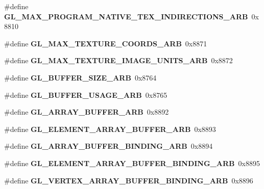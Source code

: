 \begin{DoxyCompactItemize}
\item 
\#define {\bfseries G\+L\+\_\+\+M\+A\+X\+\_\+\+P\+R\+O\+G\+R\+A\+M\+\_\+\+N\+A\+T\+I\+V\+E\+\_\+\+T\+E\+X\+\_\+\+I\+N\+D\+I\+R\+E\+C\+T\+I\+O\+N\+S\+\_\+\+A\+R\+B}~0x8810\label{_s_d_l__opengl_8h_a2be0f0ad505c7415604be985b6add29c}

\item 
\#define {\bfseries G\+L\+\_\+\+M\+A\+X\+\_\+\+T\+E\+X\+T\+U\+R\+E\+\_\+\+C\+O\+O\+R\+D\+S\+\_\+\+A\+R\+B}~0x8871\label{_s_d_l__opengl_8h_a8a43e31ad6ecfc7e840dd80cc44438b7}

\item 
\#define {\bfseries G\+L\+\_\+\+M\+A\+X\+\_\+\+T\+E\+X\+T\+U\+R\+E\+\_\+\+I\+M\+A\+G\+E\+\_\+\+U\+N\+I\+T\+S\+\_\+\+A\+R\+B}~0x8872\label{_s_d_l__opengl_8h_a4b1b083176bc9e9fc132692f589d3436}

\item 
\#define {\bfseries G\+L\+\_\+\+B\+U\+F\+F\+E\+R\+\_\+\+S\+I\+Z\+E\+\_\+\+A\+R\+B}~0x8764\label{_s_d_l__opengl_8h_a79b32a071af137fa59ca406e3e8254e7}

\item 
\#define {\bfseries G\+L\+\_\+\+B\+U\+F\+F\+E\+R\+\_\+\+U\+S\+A\+G\+E\+\_\+\+A\+R\+B}~0x8765\label{_s_d_l__opengl_8h_af76ad34f6b2ded96a99fa8fce2731a43}

\item 
\#define {\bfseries G\+L\+\_\+\+A\+R\+R\+A\+Y\+\_\+\+B\+U\+F\+F\+E\+R\+\_\+\+A\+R\+B}~0x8892\label{_s_d_l__opengl_8h_acb1c5ea3239de87d09959457ffa42f6f}

\item 
\#define {\bfseries G\+L\+\_\+\+E\+L\+E\+M\+E\+N\+T\+\_\+\+A\+R\+R\+A\+Y\+\_\+\+B\+U\+F\+F\+E\+R\+\_\+\+A\+R\+B}~0x8893\label{_s_d_l__opengl_8h_ae01505dfe71e32eddbd73c3c0ce713ba}

\item 
\#define {\bfseries G\+L\+\_\+\+A\+R\+R\+A\+Y\+\_\+\+B\+U\+F\+F\+E\+R\+\_\+\+B\+I\+N\+D\+I\+N\+G\+\_\+\+A\+R\+B}~0x8894\label{_s_d_l__opengl_8h_aa31e7d2730e196f2f41933e1b70ae121}

\item 
\#define {\bfseries G\+L\+\_\+\+E\+L\+E\+M\+E\+N\+T\+\_\+\+A\+R\+R\+A\+Y\+\_\+\+B\+U\+F\+F\+E\+R\+\_\+\+B\+I\+N\+D\+I\+N\+G\+\_\+\+A\+R\+B}~0x8895\label{_s_d_l__opengl_8h_a37d58cc04db7ee70ec314e007b4d9f5a}

\item 
\#define {\bfseries G\+L\+\_\+\+V\+E\+R\+T\+E\+X\+\_\+\+A\+R\+R\+A\+Y\+\_\+\+B\+U\+F\+F\+E\+R\+\_\+\+B\+I\+N\+D\+I\+N\+G\+\_\+\+A\+R\+B}~0x8896\label{_s_d_l__opengl_8h_ac8f950c64ca4a7a0bf04019c4f1c9980}


\end{DoxyCompactItemize}
